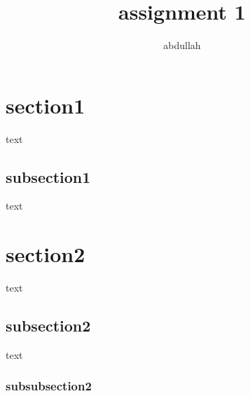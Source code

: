\documentclass{article}
\title{assignment 1}
\author{abdullah}
\begin{document}
	
	\section{section1}
	text
	\subsection{subsection1}
	text
	\section{section2}
	text
	\subsection{subsection2}
	text
	\subsubsection{subsubsection2}
	\newpage
	\tableofcontents
\end{document}
